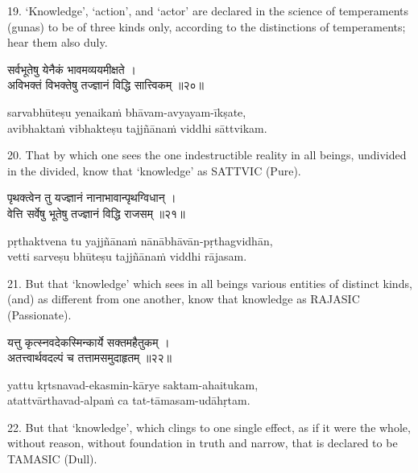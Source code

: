 19. `Knowledge', `action', and `actor' are declared in the science of
temperaments (gunas) to be of three kinds only, according to the distinctions
of temperaments; hear them also duly.

\begin{gitaverse}
सर्वभूतेषु येनैकं भावमव्ययमीक्षते । \\
अविभक्तं विभक्तेषु तज्ज्ञानं विद्धि सात्त्विकम् ॥२०॥
\end{gitaverse}

\begin{transliteration}
sarvabhūteṣu yenaikaṁ bhāvam-avyayam-īkṣate, \\
avibhaktaṁ vibhakteṣu tajjñānaṁ viddhi sāttvikam.
\end{transliteration}

20. That by which one sees the one indestructible reality in all beings,
undivided in the divided, know that `knowledge' as SATTVIC (Pure).

\begin{gitaverse}
पृथक्त्वेन तु यज्ज्ञानं नानाभावान्पृथग्विधान् । \\
वेत्ति सर्वेषु भूतेषु तज्ज्ञानं विद्धि राजसम् ॥२१॥
\end{gitaverse}

\begin{transliteration}
pṛthaktvena tu yajjñānaṁ nānābhāvān-pṛthagvidhān, \\
vetti sarveṣu bhūteṣu tajjñānaṁ viddhi rājasam.
\end{transliteration}

21. But that `knowledge' which sees in all beings various entities of distinct
kinds, (and) as different from one another, know that knowledge as RAJASIC
(Passionate).

\begin{gitaverse}
यत्तु कृत्स्नवदेकस्मिन्कार्ये सक्तमहैतुकम् । \\
अतत्त्वार्थवदल्पं च तत्तामसमुदाहृतम् ॥२२॥
\end{gitaverse}

\begin{transliteration}
yattu kṛtsnavad-ekasmin-kārye saktam-ahaitukam, \\
atattvārthavad-alpaṁ ca tat-tāmasam-udāhṛtam.
\end{transliteration}

22. But that `knowledge', which clings to one single effect, as if it were the
whole, without reason, without foundation in truth and narrow, that is declared
to be TAMASIC (Dull).

